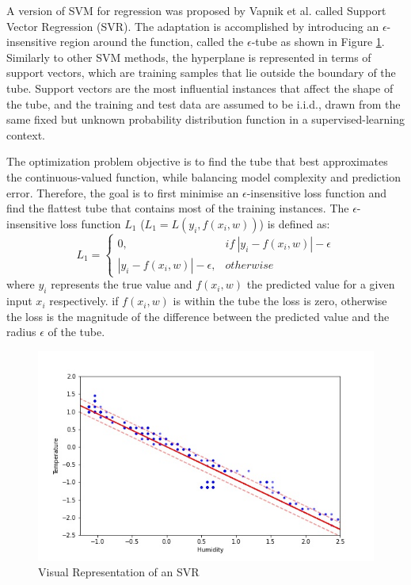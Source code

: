 \documentclass{mpaper}
\begin{document}
A version of SVM for regression was proposed by Vapnik et al. \cite{OriginalSVR} called Support Vector Regression (SVR). The adaptation is accomplished by introducing an $\epsilon$-insensitive region around the function, called the $\epsilon$-tube as shown in Figure \ref{fig-SVRex}. Similarly to other SVM methods, the hyperplane is represented in terms of support vectors, which are training samples that lie outside the boundary of the tube. Support vectors are the most influential instances that affect the shape of the tube, and the training and test data are assumed to be i.i.d., drawn from the same fixed but unknown probability distribution function in a supervised-learning context.

The optimization problem objective is to find the tube that best approximates the continuous-valued function, while balancing model complexity and prediction error. Therefore, the goal is to first minimise an $\epsilon$-insensitive loss function and find the flattest tube that contains most of the training instances. The $\epsilon$-insensitive loss function $L_1$ ($L_1=L(y_i, f(x_i,w))$) is defined as:
\begin{equation}\label{eqn:10}
    L_1 = 
    \begin{cases}
        0, & if\ |y_i- f(x_i, w)| - \epsilon \\
        |y_i- f(x_i,w)|- \epsilon, & otherwise
    \end{cases}
\end{equation}
where $y_i$ represents the true value and $f(x_i,w)$ the predicted value for a given input $x_i$ respectively. if $f(x_i,w)$ is within the tube the loss is zero, otherwise the loss is the magnitude of the difference between the predicted value and the radius $\epsilon$ of the tube.

\begin{figure}
\begin{center}
\includegraphics[scale=0.45]{SVR_representation.jpg}
\end{center}
\caption{\label{fig-SVRex}Visual Representation of an SVR}
\end{figure}
\end{document}
